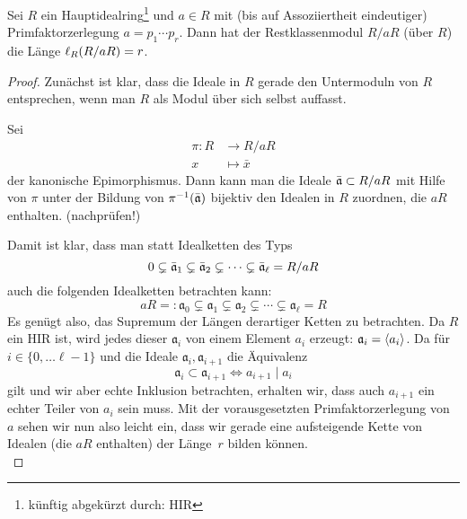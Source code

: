 \begin{thLemma}%
    \label{lem:len:hir}
    Sei $R$ ein Hauptidealring\footnote{künftig abgekürzt durch: HIR} und $a\in
    R$ mit (bis auf Assoziiertheit eindeutiger) Primfaktorzerlegung 
    $a = p_1\cdots p_r$.
    Dann hat der Restklassenmodul $R/aR$ (über $R$) die Länge $\operatorname{\ell}_{R}(R/aR) = r$.
\end{thLemma}
\begin{proof}
    Zunächst ist klar, dass die Ideale in $R$ gerade den Untermoduln von $R$
    entsprechen, wenn man $R$ als Modul über sich selbst auffasst.

    Sei 
    \begin{align*}
        \pi\colon R &\to R/aR   \\
                  x &\mapsto \bar x
    \end{align*}
    der kanonische Epimorphismus. Dann kann man die Ideale $\bar{\mathfrak{a}} \subset
    R/aR$ mit Hilfe von $\pi$ unter der Bildung von $\pi^{-1}(\bar{\mathfrak{a}})$
    bijektiv den Idealen in $R$ zuordnen, die $aR$ enthalten. (nachprüfen!)
    
    Damit ist klar, dass man statt Idealketten des Typs
    \[ 0 \subsetneq \bar{\mathfrak{a}}_1 \subsetneq \bar{\mathfrak{a}}_2 \subsetneq 
        \cdots \subsetneq \bar{\mathfrak{a}}_\ell = R/aR      \]
    auch die folgenden Idealketten betrachten kann:
    \[ aR =: \mathfrak{a}_0 \subsetneq \mathfrak{a}_1 
                \subsetneq \mathfrak{a}_2 \subsetneq 
                \cdots \subsetneq \mathfrak{a}_\ell = R        \]
    Es genügt also, das Supremum der Längen derartiger Ketten zu betrachten. Da
    $R$ ein HIR ist, wird jedes dieser $\mathfrak{a}_i$ von einem Element $a_i$
    erzeugt: $\mathfrak{a}_i = \langle a_i\rangle$. Da für $i\in\{0,\ldots \ell-1\}$ und
    die Ideale $\mathfrak{a}_i,\mathfrak{a}_{i+1}$ die Äquivalenz
    \[ \mathfrak{a}_i \subset \mathfrak{a}_{i+1} \iff a_{i+1} \mid a_i \]
    gilt und wir aber echte Inklusion betrachten, erhalten wir, dass auch
    $a_{i+1}$ ein echter Teiler von $a_i$ sein muss. Mit der vorausgesetzten
    Primfaktorzerlegung von $a$ sehen wir nun also leicht ein, dass wir gerade
    eine aufsteigende Kette von Idealen (die $aR$ enthalten) der Länge~$r$
    bilden können.
    \\
\end{proof}

